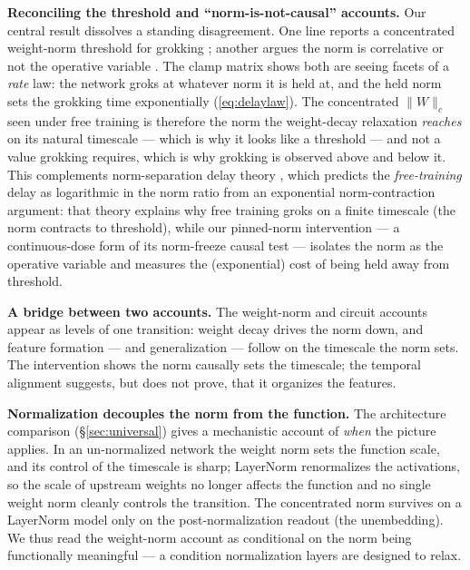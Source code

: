 \documentclass[10pt,twocolumn]{article}
\newcommand{\Wc}{\|W\|_{c}}
\begin{document}
\textbf{Reconciling the threshold and ``norm-is-not-causal'' accounts.} Our central result dissolves a
standing disagreement. One line reports a concentrated weight-norm threshold for grokking
\citep{liu2022omnigrok,systematic2026grokking,neuralcollapse2026}; another argues the norm is correlative
or not the operative variable \citep{golechha2024progress,minegishi2023grokking,notsawo2025euclidean,nonstationarity2025}.
The clamp matrix shows both are seeing facets of a \emph{rate} law: the network groks at whatever norm it is
held at, and the held norm sets the grokking time exponentially (\ref{eq:delaylaw}). The concentrated $\Wc$
seen under free training is therefore the norm the weight-decay relaxation \emph{reaches} on its natural
timescale --- which is why it looks like a threshold --- and not a value grokking requires, which is why
grokking is observed above and below it. This complements norm-separation delay theory
\citep{truong2026normsep}, which predicts the \emph{free-training} delay as
logarithmic in the norm ratio from an exponential norm-contraction argument: that theory explains why free
training groks on a finite timescale (the norm contracts to threshold), while our pinned-norm intervention
--- a continuous-dose form of its norm-freeze causal test --- isolates the norm as the operative variable
and measures the (exponential) cost of being held away from threshold.

\textbf{A bridge between two accounts.} The weight-norm and circuit accounts appear as levels of one
transition: weight decay drives the norm down, and feature formation --- and generalization --- follow on
the timescale the norm sets. The intervention shows the norm causally sets the timescale; the temporal
alignment suggests, but does not prove, that it organizes the features.

\textbf{Normalization decouples the norm from the function.} The architecture comparison
(\S\ref{sec:universal}) gives a mechanistic account of \emph{when} the picture applies. In an un-normalized
network the weight norm sets the function scale, and its control of the timescale is sharp; LayerNorm
renormalizes the activations, so the scale of upstream weights no longer affects the function and no single
weight norm cleanly controls the transition. The concentrated norm survives on a LayerNorm model only on
the post-normalization readout (the unembedding). We thus read the weight-norm account as conditional on the
norm being functionally meaningful --- a condition normalization layers are designed to relax.
\end{document}
